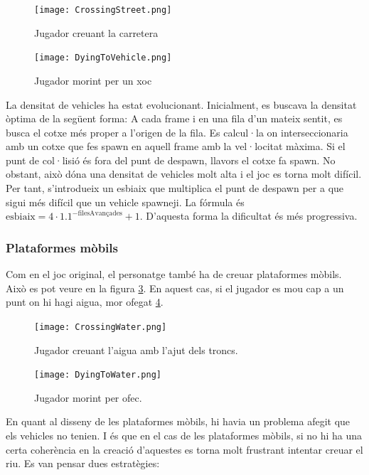 \documentclass{article}
\begin{document}
\begin{figure}[h!]
	\texttt{[image: CrossingStreet.png]}
	\caption{Jugador creuant la carretera}
	\label{creuantCarretera}
\end{figure}

\begin{figure}[h!]
	\texttt{[image: DyingToVehicle.png]}
	\caption{Jugador morint per un xoc}
	\label{morintCarretera}
\end{figure}

La densitat de vehicles ha estat evolucionant. Inicialment, es buscava
la densitat òptima de la següent forma: A cada frame i en una fila d'un
mateix sentit, es busca el cotxe més proper a l'origen de la fila.
Es calcul·la on interseccionaria amb un cotxe que fes spawn en aquell frame
amb la vel·locitat màxima. Si el punt de col·lisió és fora del punt
de despawn, llavors el cotxe fa spawn.
No obstant, això dóna una densitat de vehicles molt alta i el joc es
torna molt difícil. Per tant, s'introdueix un esbiaix que multiplica
el punt de despawn per a que sigui més difícil que un vehicle spawneji.
La fórmula és $\text{esbiaix} = 4 \cdot {1.1}^{-\text{filesAvançades}} + 1$.
D'aquesta forma la dificultat és més progressiva.

\subsubsection{Plataformes mòbils}

Com en el joc original, el personatge també ha de creuar plataformes mòbils.
Això es pot veure en la figura \ref{creuantAigua}. En aquest cas,
si el jugador es mou cap a un punt on hi hagi aigua, mor ofegat 
\ref{morintAigua}.

\begin{figure}[h!]
	\texttt{[image: CrossingWater.png]}
	\caption{Jugador creuant l'aigua amb l'ajut dels troncs.}
	\label{creuantAigua}
\end{figure}

\begin{figure}[h!]
	\texttt{[image: DyingToWater.png]}
	\caption{Jugador morint per ofec.}
	\label{morintAigua}
\end{figure}

En quant al disseny de les plataformes mòbils, hi havia un problema
afegit que els vehicles no tenien. I és que en el cas de les plataformes
mòbils, si no hi ha una certa coherència en la creació d'aquestes
es torna molt frustrant intentar creuar el riu. Es van pensar dues
estratègies:
\end{document}
